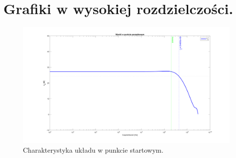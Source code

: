 \documentclass{article}
\begin{document}
\pagebreak

\clearpage
\section{Grafiki w wysokiej rozdzielczości.}

\begin{landscape}
    \begin{figure}[h]
        \vspace*{-2cm}
        \includegraphics[width=25cm,height=15 cm]{graphics/starting_point.png}
        \centering
        \caption{Charakterystyka układu w punkcie startowym.}
    \end{figure}
\end{landscape}
\end{document}

